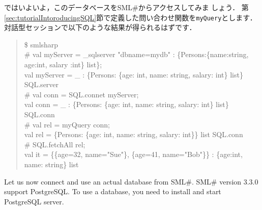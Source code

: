 \documentclass{jbook}
\newcommand{\smlsharp}{SML\#}
\newcommand{\version}{3.3.0}
\newenvironment{program}{\begin{quote}\begin{tt}}%
                        {\end{tt}\end{quote}}
\begin{document}
	ではいよいよ，このデータベースを\smlsharp{}からアクセスしてみま
しょう．
	第\ref{sec:tutorialIntoroducingSQL}節で定義した問い合わせ関数を{\tt myQuery}とします．
	対話型セッションで以下のような結果が得られるはずです．
\begin{program}
\$ smlsharp\\
\# val myServer = \_sqlserver "dbname=mydb" : \{Persons:\{name:string, age:int, salary :int\} list\};\\
val myServer = \_ : \{Persons: \{age: int, name: string, salary: int\} list\} SQL.server\\
\# val conn = SQL.connet myServer;\\
val conn = \_ : \{Persons: \{age: int, name: string, salary: int\} list\} SQL.conn\\
\# val rel = myQuery conn;\\
val rel = \{Persons: \{age: int, name: string, salary: int\}\} list SQL.conn\\
\# SQL.fetchAll rel;\\
val it = \{\{age=32, name="Sue"\}, \{age=41, name="Bob"\}\} : \{age:int, name: string\} list
\end{program}
\else%
	Let us now connect and use an actual database from \smlsharp{}.
	\smlsharp{} version \version{} support PostgreSQL.
	To use a database, you need to install and start PostgreSQL server.
	
\end{document}
